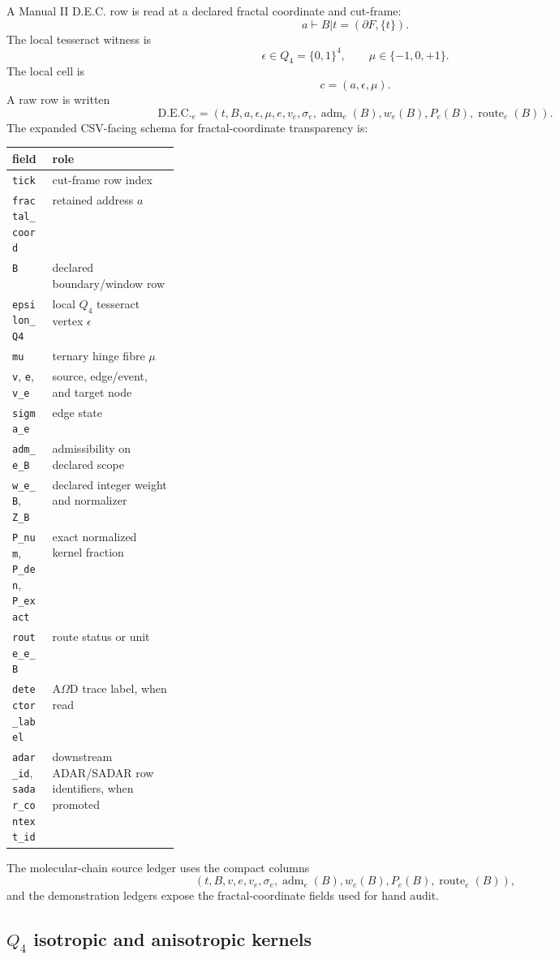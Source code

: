 A Manual II D.E.C. row is read at a declared fractal coordinate and cut-frame:
\[
a\vdash B|t=(\partial F,\{t\}).
\]
The local tesseract witness is
\[
\epsilon\in Q_4=\{0,1\}^4,
\qquad
\mu\in\{-1,0,+1\}.
\]
The local cell is
\[
c=(a,\epsilon,\mu).
\]
A raw row is written
\[
\mathrm{D.E.C.}_e=(t,B,a,\epsilon,\mu,e,v_e,\sigma_e,\operatorname{adm}_e(B),w_e(B),P_e(B),\operatorname{route}_e(B)).
\]
The expanded CSV-facing schema for fractal-coordinate transparency is:
\begin{center}
\scriptsize
\begin{tabularx}{0.98\linewidth}{@{}p{0.24\linewidth}X@{}}
\toprule
field & role \\
\midrule
\texttt{tick} & cut-frame row index \\
\texttt{fractal\_coord} & retained address $a$ \\
\texttt{B} & declared boundary/window row \\
\texttt{epsilon\_Q4} & local $Q_4$ tesseract vertex $\epsilon$ \\
\texttt{mu} & ternary hinge fibre $\mu$ \\
\texttt{v}, \texttt{e}, \texttt{v\_e} & source, edge/event, and target node \\
\texttt{sigma\_e} & edge state \\
\texttt{adm\_e\_B} & admissibility on declared scope \\
\texttt{w\_e\_B}, \texttt{Z\_B} & declared integer weight and normalizer \\
\texttt{P\_num}, \texttt{P\_den}, \texttt{P\_exact} & exact normalized kernel fraction \\
\texttt{route\_e\_B} & route status or unit \\
\texttt{detector\_label} & A$\Omega$D trace label, when read \\
\texttt{adar\_id}, \texttt{sadar\_context\_id} & downstream ADAR/SADAR row identifiers, when promoted \\
\bottomrule
\end{tabularx}
\end{center}

The molecular-chain source ledger uses the compact columns
\[
(t,B,v,e,v_e,\sigma_e,\operatorname{adm}_e(B),w_e(B),P_e(B),\operatorname{route}_e(B)),
\]
and the demonstration ledgers expose the fractal-coordinate fields used for hand audit.

\subsection{$Q_4$ isotropic and anisotropic kernels}

